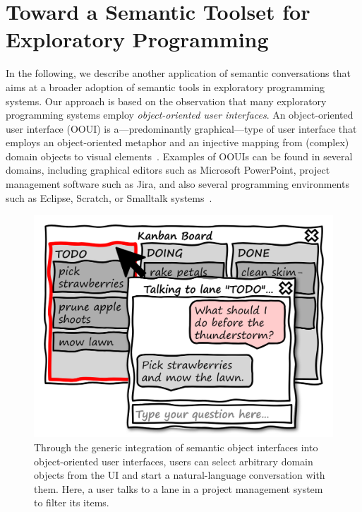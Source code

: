 
\section{Toward a Semantic Toolset for Exploratory Programming}
\label{sec:application/system}

In the following, we describe another application of semantic conversations that aims at a broader adoption of semantic tools in exploratory programming systems.
Our approach is based on the observation that many exploratory programming systems employ \emph{object-oriented user interfaces}.
An object-oriented user interface (OOUI) is a---predominantly graphical---type of user interface that employs an object-oriented metaphor and an injective mapping from (complex) domain objects to visual elements~\cite{collins1995designing}.
Examples of OOUIs can be found in several domains, including graphical editors such as Microsoft PowerPoint, project management software such as Jira, and also several programming environments such as Eclipse, Scratch, or Smalltalk systems~\cite{pawson2001naked}.

\begin{figure}
	\centering
	\includegraphics[height=12\baselineskip]{chapters/08_application/03_system/project.png}
	\caption[Sketching a generic integration of semantic object interfaces into object-oriented user interfaces.]{
		Through the generic integration of semantic object interfaces into object-oriented user interfaces, users can select arbitrary domain objects from the UI and start a natural-language conversation with them.
		Here, a user talks to a lane in a project management system to filter its items.
	}
	\label{fig:application/system/project}
\end{figure}

